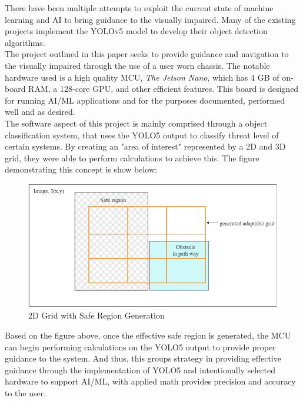 \noindent There have been multiple attempts to exploit the current state of machine learning and AI to bring guidance to the visually impaired. Many of the existing projects implement the YOLOv5 model to develop their object detection algorithms.\\

\noindent The project outlined in this paper \cite{CVRef1} seeks to provide guidance and navigation to the visually impaired through the use of a user worn chassis. The notable hardware used is a high quality MCU, \textit{The Jetson Nano}, which has 4 GB of on-board RAM, a 128-core GPU, and other efficient features. This board is designed for running AI/ML applications and for the purposes documented, performed well and as desired. \\

\noindent The software aspect of this project is mainly comprised through a object classification system, that uses the YOLO5 output to classify threat level of certain systems. By creating an "area of interest" represented by a 2D and 3D grid, they were able to perform calculations to achieve this. The figure demonstrating this concept is show below:
				
\begin{figure}[H]
	\centering
	\includegraphics[width=\textwidth]{./Images/Figure1_Grid_Detection.png}
	\caption{\label{fig:Grid-Generatio}2D Grid with Safe Region Generation}
\end{figure}

\noindent Based on the figure above, once the effective safe region is generated, the MCU can begin performing calculations on the YOLO5 output to provide proper guidance to the system. And thus, this groups strategy in providing effective guidance through the implementation of YOLO5 and intentionally selected hardware to support AI/ML, with  applied math provides precision and accuracy to the user. \\


